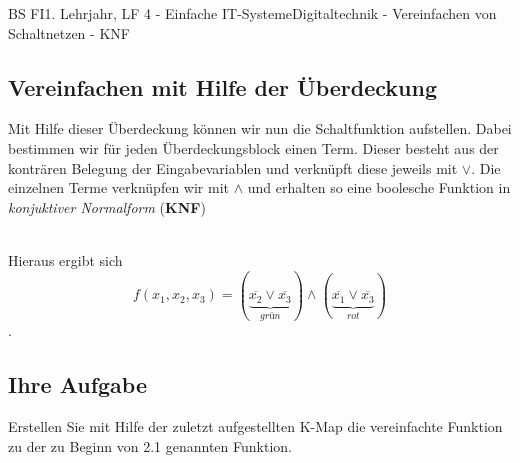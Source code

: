 \documentclass[11pt,twocolumn,oneside,openany,headings=optiontotoc,11pt,numbers=noenddot]{article}
\begin{document}
\begin{worksheet}{BS FI}{1. Lehrjahr, LF 4 - Einfache IT-Systeme}{Digitaltechnik - Vereinfachen von Schaltnetzen - KNF}
		\subsection{Vereinfachen mit Hilfe der Überdeckung}
		Mit Hilfe dieser Überdeckung können wir nun die Schaltfunktion aufstellen. Dabei bestimmen wir für jeden Überdeckungsblock einen Term. Dieser besteht aus der konträren Belegung der Eingabevariablen und verknüpft diese jeweils mit \(\lor\). Die einzelnen Terme verknüpfen wir mit \(\land\) und erhalten so eine boolesche Funktion in \textit{konjuktiver Normalform} (\textbf{KNF})
		\begin{karnaugh-map}[4][2][1][$x_2x_3$][$x_1$]
		\end{karnaugh-map}\\
		Hieraus ergibt sich \[f(x_1,x_2,x_3) = (\underbrace{\overline{x_2}\lor\overline{x_3}}_{grün}) \land (\underbrace{\overline{x_1}\lor\overline{x_3}}_{rot})\].\\
		\subsection*{Ihre Aufgabe} Erstellen Sie mit Hilfe der zuletzt aufgestellten K-Map die vereinfachte Funktion zu der zu Beginn von 2.1 genannten Funktion.\\
	\end{worksheet}
\end{document}

